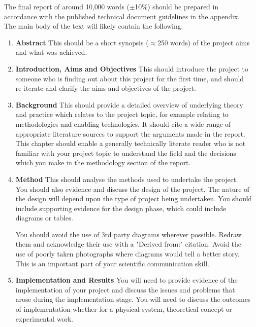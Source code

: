 The final report of around 10,000 words ($\pm$10\%) should be prepared in accordance with the published technical document guidelines in the appendix. The main body of the text will likely contain the following: 

\begin{enumerate}
    \item \textbf{Abstract}
    \subitem This should be a short synopsis ($\approx$250 words) of the project aims and what was achieved.

    \item \textbf{Introduction, Aims and Objectives}
    \subitem This should introduce the project to someone who is finding out about this project for the first time, and should re-iterate and clarify the aims and objectives of the project.

    \item \textbf{Background}
    \subitem This should provide a detailed overview of underlying theory and practice which relates to the project topic, for example relating to methodologies and enabling technologies. It should cite a wide range of appropriate literature sources to support the arguments made in the report. This chapter should enable a generally technically literate reader who is not familiar with your project topic to understand the field and the decisions which you make in the methodology section of the report.

    \item \textbf{Method}
    \subitem This should analyse the methods used to undertake the project. You should also evidence and discuss the design of the project. The nature of the design will depend upon the type of project being undertaken. You should include supporting evidence for the design phase, which could include diagrams or tables.

    \begin{tcolorbox}
        You should avoid the use of 3rd party diagrams wherever possible. Redraw them and acknowledge their use with a "Derived from:" citation. Avoid the use of poorly taken photographs where diagrams would tell a better story. This is an important part of your scientific communication skill.
    \end{tcolorbox}

    \item \textbf{Implementation and Results}
    \subitem You will need to provide evidence of the implementation of your project and discuss the issues and problems that arose during the implementation stage. You will need to discuss the outcomes of implementation whether for a physical system, theoretical concept or experimental work.


\end{enumerate}
